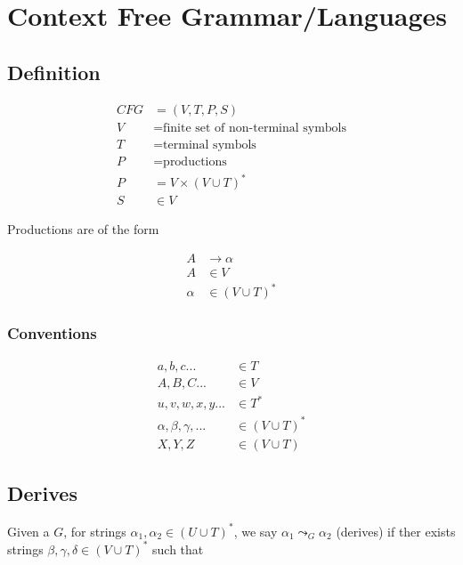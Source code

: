 \chapter{Context Free Grammar/Languages}

\section{Definition}

  \begin{align}
    CFG &= \left( V, T, P, S \right) \\
    V &= \text{finite set of non-terminal symbols} \\
    T &= \text{terminal symbols} \\
    P &= \text{productions} \\
    P &= V \times \left( V \cup T \right)^{*} \\
    S &\in V
  \end{align}

  Productions are of the form

  \begin{align}
    A &\to \alpha \\
    A &\in V \\
    \alpha &\in \left( V \cup T \right)^{*}
  \end{align}

  \subsection{Conventions}

    \begin{align}
      a, b, c ... &\in T \\
      A, B, C ... &\in V \\
      u, v, w, x, y ... &\in T^{*} \\
      \alpha, \beta, \gamma, ... &\in \left( V \cup T \right)^{*} \\
      X, Y, Z &\in \left( V \cup T \right)
    \end{align}

\section{Derives}

  Given a $ G $, for strings $ \alpha_{1}, \alpha_{2} \in \left( U \cup T \right)^{*} $,
  we say $ \alpha_{1} \leadsto_{G} \alpha_{2} $ (derives) if ther exists
  strings $ \beta, \gamma, \delta \in \left( V \cup T \right)^{*} $ such that

